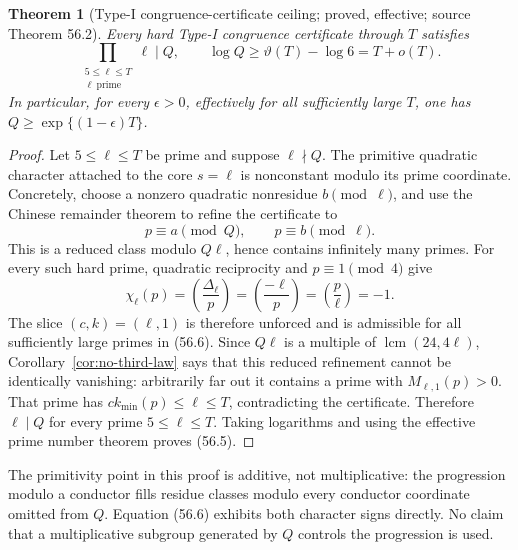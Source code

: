 \documentclass[10pt,reqno]{amsart}
\newtheorem{theorem}{Theorem}[section]
\theoremstyle{definition}
\newcommand{\lcm}{\operatorname {lcm}}
\newcommand{\1}{\mathbf 1}
\begin{document}
\begin{theorem}[Type-I congruence-certificate ceiling; proved, effective;
source Theorem 56.2]\label{thm:typeI-certificate}
Every hard Type-I congruence certificate through $T$ satisfies
\begin{equation}\tag{56.5}
 \prod_{\substack{5\leq\ell\leq T\\\ell\ \mathrm{prime}}}\ell\mid Q,
 \qquad \log Q\geq\vartheta(T)-\log6=T+o(T).
\end{equation}
In particular, for every $\epsilon>0$, effectively for all sufficiently
large $T$, one has $Q\geq\exp\{(1-\epsilon)T\}$.
\end{theorem}
\begin{proof}
Let $5\leq\ell\leq T$ be prime and suppose $\ell\nmid Q$.  The primitive
quadratic character attached to the core $s=\ell$ is nonconstant modulo its
prime coordinate.  Concretely, choose a nonzero quadratic nonresidue
$b\pmod\ell$, and use the Chinese remainder theorem to refine the
certificate to
\begin{equation}\tag{56.6}
                  p\equiv a\pmod Q,
             \qquad p\equiv b\pmod\ell.
\end{equation}
This is a reduced class modulo $Q\ell$, hence contains infinitely many
primes.  For every such hard prime, quadratic reciprocity and
$p\equiv1\pmod4$ give
\begin{equation}\tag{56.7}
 \chi_\ell(p)=\left(\frac{\Delta_\ell}{p}\right)
       =\left(\frac{-\ell}{p}\right)
       =\left(\frac p\ell\right)=-1.
\end{equation}
The slice $(c,k)=(\ell,1)$ is therefore unforced and is admissible for all
sufficiently large primes in (56.6).  Since $Q\ell$ is a multiple of
$\lcm(24,4\ell)$, Corollary~\ref{cor:no-third-law} says that this reduced
refinement cannot be identically vanishing: arbitrarily far out it contains
a prime with $M_{\ell,1}(p)>0$.  That prime has
$ck_{\min}(p)\leq\ell\leq T$, contradicting the certificate.  Therefore
$\ell\mid Q$ for every prime $5\leq\ell\leq T$.  Taking logarithms and
using the effective prime number theorem proves (56.5).
\end{proof}

The primitivity point in this proof is additive, not multiplicative: the
progression modulo a conductor fills residue classes modulo every conductor
coordinate omitted from $Q$.  Equation (56.6) exhibits both character signs
directly.  No claim that a multiplicative subgroup generated by $Q$
controls the progression is used.
\end{document}
